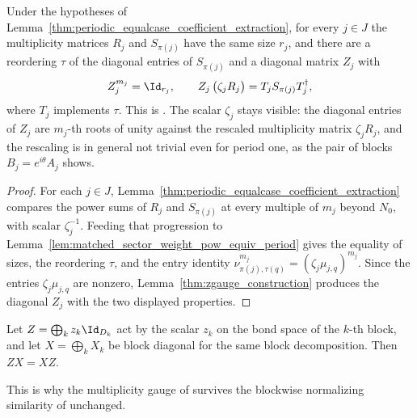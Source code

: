 \begin{lemma}%
    \label{thm:periodic_equalcase_blockwise_zgauge}
    \leanok
    Under the hypotheses of
    Lemma~\ref{thm:periodic_equalcase_coefficient_extraction}, for every
    $j\in J$ the multiplicity matrices $R_j$ and $S_{\pi(j)}$ have the same
    size $r_j$, and there are a reordering $\tau$ of the diagonal entries of
    $S_{\pi(j)}$ and a diagonal matrix $Z_j$ with
    \begin{align}
        Z_j^{m_j}=\Id_{r_j},\qquad
        Z_j\,\bigl(\zeta_j R_j\bigr)=T_jS_{\pi(j)}T_j^{\dagger},
        \notag
    \end{align}
    where $T_j$ implements $\tau$. This is
    \cite[lines~681--688]{DeLasCuevas2017Irreducible}. The scalar $\zeta_j$
    stays visible: the diagonal entries of $Z_j$ are $m_j$-th roots of unity
    against the rescaled multiplicity matrix $\zeta_jR_j$, and the rescaling
    is in general not trivial even for period one, as the pair of blocks
    $B_j=e^{i\theta}A_j$ shows.
\end{lemma}

\begin{proof}\leanok
    For each $j\in J$,
    Lemma~\ref{thm:periodic_equalcase_coefficient_extraction} compares the
    power sums of $R_j$ and $S_{\pi(j)}$ at every multiple of $m_j$ beyond
    $N_0$, with scalar $\zeta_j^{-1}$. Feeding that progression to
    Lemma~\ref{lem:matched_sector_weight_pow_equiv_period} gives the equality
    of sizes, the reordering $\tau$, and the entry identity
    $\nu_{\pi(j),\tau(q)}^{m_j}=(\zeta_j\mu_{j,q})^{m_j}$. Since the entries
    $\zeta_j\mu_{j,q}$ are nonzero,
    Lemma~\ref{thm:zgauge_construction} produces the diagonal $Z_j$ with the
    two displayed properties.
\end{proof}

\begin{lemma}%
    \label{lem:block_scalar_gauge_comm}
    \leanok
    Let $Z=\bigoplus_k z_k\Id_{D_k}$ act by the scalar $z_k$ on the bond space
    of the $k$-th block, and let $X=\bigoplus_k X_k$ be block diagonal for the
    same block decomposition. Then $ZX=XZ$.

    This is why the multiplicity gauge of
    \cite[line~653]{DeLasCuevas2017Irreducible} survives the blockwise
    normalizing similarity of \cite[lines~313--332]{DeLasCuevas2017Irreducible}
    unchanged.
\end{lemma}

